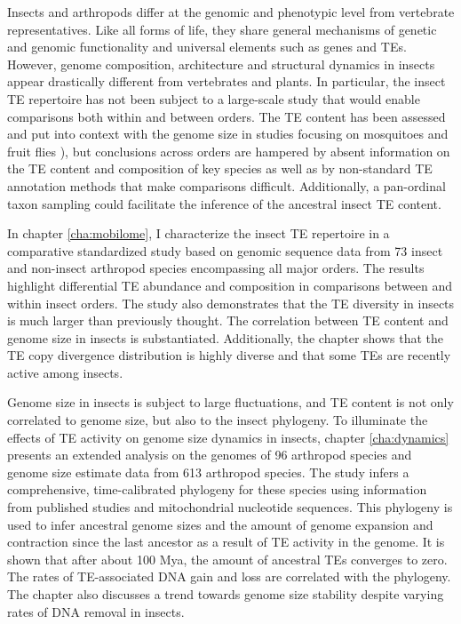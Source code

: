 Insects and arthropods differ at the genomic and phenotypic level from
vertebrate representatives.  Like all forms of life, they share general
mechanisms of genetic and genomic functionality and universal elements
such as genes and TEs.  However, genome composition, architecture and
structural dynamics in insects appear drastically different from
vertebrates and plants.  In particular, the insect TE repertoire has not
been subject to a large-scale study that would enable comparisons both
within and between orders.  The TE content has been assessed and put into
context with the genome size in studies focusing on mosquitoes
\citep{Neafsey2015} and  fruit flies
\citep{Sessegolo2016}), but conclusions across orders are hampered by
absent information on the TE content and composition of key species as
well as by non-standard TE annotation methods that make comparisons
difficult.  Additionally, a pan-ordinal taxon sampling could facilitate
the inference of the ancestral insect TE content. 


In chapter \ref{cha:mobilome}, I characterize the insect TE repertoire
in a comparative standardized study based on genomic sequence data from
73 insect and non-insect arthropod species encompassing all major
orders.  The results highlight differential TE abundance and composition
in comparisons between and within insect orders.  The study also
demonstrates that the TE diversity in insects is much larger than
previously thought.  The correlation between TE content and genome size
in insects is substantiated.  Additionally, the chapter shows that the TE
copy divergence distribution is highly diverse and that some TEs are
recently active among insects.


Genome size in insects is subject to large fluctuations, and TE content
is not only correlated to genome size, but also to the insect phylogeny.
To illuminate the effects of TE activity on genome size dynamics in
insects, chapter \ref{cha:dynamics} presents an extended analysis on the
genomes of 96 arthropod species and genome size estimate data from 613
arthropod species.  The study infers a comprehensive, time-calibrated
phylogeny for these species using information from published studies and
mitochondrial nucleotide sequences.  This phylogeny is used to infer
ancestral genome sizes and the amount of genome expansion and
contraction since the last ancestor as a result of TE activity in the
genome.  It is shown that after about 100 Mya, the amount of ancestral
TEs converges to zero.  The rates of TE-associated DNA gain and loss are
correlated with the phylogeny.  The chapter also discusses a trend
towards genome size stability despite varying rates of DNA removal in
insects.

